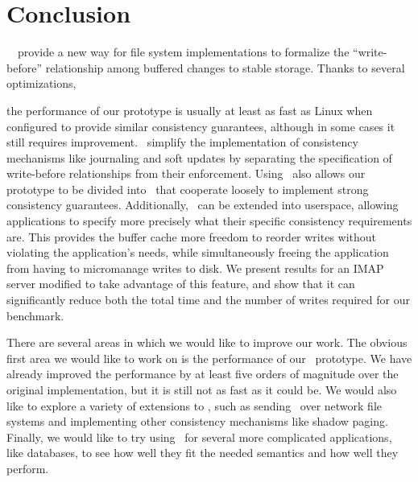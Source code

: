 \section{Conclusion}
\label{sec:conclusion}

\Kudos\ \patches\ provide a new way for file system implementations to formalize
the ``write-before'' relationship among buffered changes to stable storage.
%
Thanks to several optimizations,
\begin{comment}
which significantly decrease the overhead
required to use \patches, both in terms of the amount of memory required and the
CPU time spent.
%
We evaluate a prototype file system implementation using \patches\ to determine
whether these ideas can be used in production file systems.
%
\end{comment}
the
performance of our prototype is usually at least as fast as Linux when
configured to provide similar consistency guarantees, although in some cases it
still requires improvement.
%
\Patches\ simplify the implementation of consistency mechanisms like journaling
and soft updates by separating the specification of write-before
relationships from their enforcement.
%
Using \patches\ also allows our prototype to be divided into \modules\ that
cooperate loosely to implement strong consistency guarantees.
%
Additionally, \patches\ can be extended into userspace, allowing applications to
specify more precisely what their specific consistency requirements are.
%
This provides the buffer cache more freedom to reorder writes without violating
the application's needs, while simultaneously freeing the application from
having to micromanage writes to disk.
%
We present results for an IMAP server modified to take advantage of this
feature, and show that it can significantly reduce both the total time and the
number of writes required for our benchmark.


There are several areas in which we would like to improve our work. The obvious
first area we would like to work on is the performance of our \Kudos\ prototype.
%
We have already improved the performance by at least five orders of magnitude
over the original implementation, but it is still not as fast as it could be.
%
We would also like to explore a variety of extensions to \Kudos, such as
sending \patches\ over network file systems and implementing other consistency
mechanisms like shadow paging.
%
Finally, we would like to try using \patchgroups\ for several more complicated
applications, like databases, to see how well they fit the needed semantics and
how well they perform.
